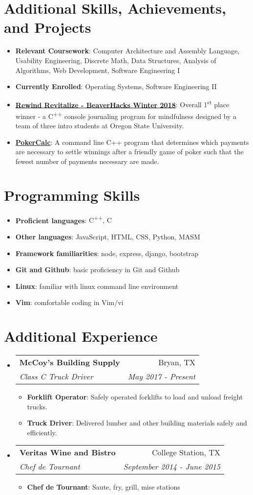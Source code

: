 \documentclass[letterpaper,11pt]{article}
\makeatletter
\newcommand{\resumeItem}[2]{
  \item\small{
    \textbf{#1}{: #2 \vspace{-2pt}}
  }
}
\newcommand{\resumeSubheading}[4]{
  \vspace{-1pt}\item
    \begin{tabular*}{0.97\textwidth}[t]{l@{\extracolsep{\fill}}r}
      \textbf{#1} & #2 \\
      \textit{\small#3} & \textit{\small #4} \\
    \end{tabular*}\vspace{-5pt}
}
\newcommand{\resumeSubItem}[2]{\resumeItem{#1}{#2}\vspace{-4pt}}
\newcommand{\resumeSubHeadingListStart}{\begin{itemize}[leftmargin=*]}
\newcommand{\resumeSubHeadingListEnd}{\end{itemize}}
\newcommand{\resumeItemListStart}{\begin{itemize}}
\newcommand{\resumeItemListEnd}{\end{itemize}\vspace{-5pt}}
\makeatother
\begin{document}
\section{Additional Skills, Achievements, and Projects}
  \resumeSubHeadingListStart
    \resumeSubItem{Relevant Coursework}
      {Computer Architecture and Assembly Language, Usability Engineering, Discrete Math, Data Structures, Analysis of Algorithms, Web Development, Software Engineering I}
    \resumeSubItem{Currently Enrolled}
    	{Operating Systems, Software Engineering II}
    \resumeSubItem{\href{https://github.com/jkbartos/rewind-revitalize}{Rewind Revitalize - BeaverHacks Winter 2018}}{Overall 1\textsuperscript{st} place winner - a C\textsuperscript{++} console journaling program for mindfulness designed by a team of three intro students at Oregon State University.}
    \resumeSubItem{\href{https://github.com/jordankbartos/PokerCalc}{PokerCalc}}
      {A command line C++ program that determines which payments are necessary to settle winnings after a friendly game of poker such that the fewest number of payments necessary are made.}

    
  \resumeSubHeadingListEnd
\hfill

\section{Programming Skills}
  \resumeSubHeadingListStart
    \resumeSubItem{Proficient languages}{ C\textsuperscript{++}, C}
    \resumeSubItem{Other languages}{JavaScript, HTML, CSS, Python, MASM}
    \resumeSubItem{Framework familiarities}{node, express, django, bootstrap}
    \resumeSubItem{Git and Github}{basic proficiency in Git and Github}
    \resumeSubItem{Linux}{familiar with linux command line environment}
    \resumeSubItem{Vim}{comfortable coding in Vim/vi}
  \resumeSubHeadingListEnd
 \hfill

\section{Additional Experience}
  \resumeSubHeadingListStart

      

 \resumeSubheading
      {McCoy's Building Supply}{Bryan, TX}
      {Class C Truck Driver}{May 2017 - Present}
      \resumeItemListStart
      		\resumeItem{Forklift Operator}
      		{Safely operated forklifts to load and unload freight trucks.}
      		\resumeItem{Truck Driver}
      		{Delivered lumber and other building materials safely and efficiently.}
      \resumeItemListEnd
      
      
    \resumeSubheading
      {Veritas Wine and Bistro}{College Station, TX}
      {Chef de Tournant}{September 2014 - June 2015}
      \resumeItemListStart
        \resumeItem{Chef de Tournant}
          {Saute, fry, grill, mise stations}\\
      \resumeItemListEnd
 
      
      
\resumeSubHeadingListEnd
\end{document}
